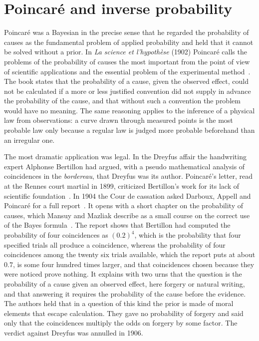 \section{Poincar\'e and inverse probability}

Poincar\'e was a Bayesian in the precise sense that he regarded the probability of causes as the fundamental problem of applied probability and held that it cannot be solved without a prior. In \emph{La science et l'hypoth\`ese} (1902) Poincar\'e calls the problems of the probability of causes the most important from the point of view of scientific applications and the essential problem of the experimental method~\cite{poincare1902}. The book states that the probability of a cause, given the observed effect, could not be calculated if a more or less justified convention did not supply in advance the probability of the cause, and that without such a convention the problem would have no meaning. The same reasoning applies to the inference of a physical law from observations: a curve drawn through measured points is the most probable law only because a regular law is judged more probable beforehand than an irregular one.

The most dramatic application was legal. In the Dreyfus affair the handwriting expert Alphonse Bertillon had argued, with a pseudo mathematical analysis of coincidences in the \emph{bordereau}, that Dreyfus was its author. Poincar\'e's letter, read at the Rennes court martial in 1899, criticized Bertillon's work for its lack of scientific foundation~\cite{mazliak2012}. In 1904 the Cour de cassation asked Darboux, Appell and Poincar\'e for a full report~\cite{darboux1904}. It opens with a short chapter on the probability of causes, which Mansuy and Mazliak describe as a small course on the correct use of the Bayes formula~\cite{mansuymazliak2005}. The report shows that Bertillon had computed the probability of four coincidences as $(0.2)^4$, which is the probability that four specified trials all produce a coincidence, whereas the probability of four coincidences among the twenty six trials available, which the report puts at about $0.7$, is some four hundred times larger, and that coincidences chosen because they were noticed prove nothing. It explains with two urns that the question is the probability of a cause given an observed effect, here forgery or natural writing, and that answering it requires the probability of the cause before the evidence. The authors held that in a question of this kind the prior is made of moral elements that escape calculation. They gave no probability of forgery and said only that the coincidences multiply the odds on forgery by some factor. The verdict against Dreyfus was annulled in 1906.


